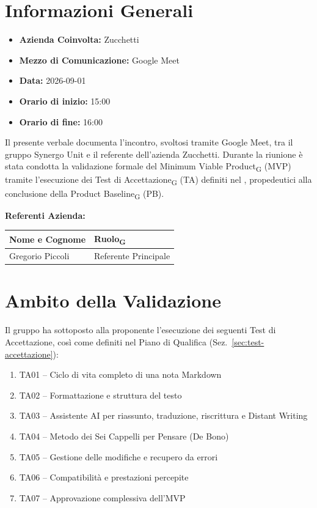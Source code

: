 \section{Informazioni Generali}
\begin{itemize}
	\item \textbf{Azienda Coinvolta:} Zucchetti
	\item \textbf{Mezzo di Comunicazione:} Google Meet
	\item \textbf{Data:} 2026-09-01
	\item \textbf{Orario di inizio:} 15:00
	\item \textbf{Orario di fine:} 16:00
\end{itemize}

Il presente verbale documenta l'incontro, svoltosi tramite Google Meet, tra il gruppo Synergo Unit e il referente dell'azienda Zucchetti. Durante la riunione è stata condotta la validazione formale del Minimum Viable Product\textsubscript{G} (MVP) tramite l'esecuzione dei Test di Accettazione\textsubscript{G} (TA) definiti nel , propedeutici alla conclusione della Product Baseline\textsubscript{G} (PB).

\vspace{0.5cm}
\textbf{Referenti Azienda:}
\begin{table}[ht]
	\centering
	\renewcommand{\arraystretch}{1.2}
	\begin{tabularx}{\textwidth}{X l}
		\toprule
		\textbf{Nome e Cognome} & \textbf{Ruolo\textsubscript{G}} \\
		\midrule
		Gregorio Piccoli & Referente Principale \\
		\bottomrule
	\end{tabularx}
\end{table}

\section{Ambito della Validazione}
Il gruppo ha sottoposto alla proponente l'esecuzione dei seguenti Test di Accettazione, così come definiti nel Piano di Qualifica (Sez.~\ref{sec:test-accettazione}):

\begin{enumerate}
	\item TA01 -- Ciclo di vita completo di una nota Markdown
	\item TA02 -- Formattazione e struttura del testo
	\item TA03 -- Assistente AI per riassunto, traduzione, riscrittura e Distant Writing
	\item TA04 -- Metodo dei Sei Cappelli per Pensare (De Bono)
	\item TA05 -- Gestione delle modifiche e recupero da errori
	\item TA06 -- Compatibilità e prestazioni percepite
	\item TA07 -- Approvazione complessiva dell'MVP
\end{enumerate}

